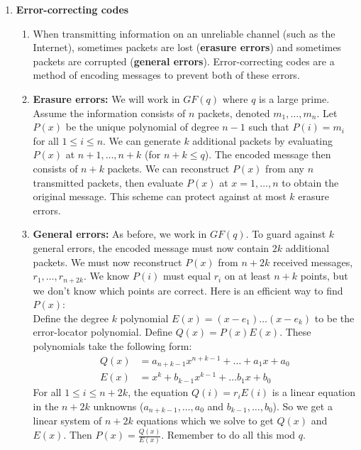 \documentclass[10pt]{article}
\begin{document}
\begin{multicols}{2}
\begin{enumerate}
    \item \textbf{Error-correcting codes}
    \begin{enumerate}
        \item When transmitting information on an unreliable channel (such as the Internet), sometimes packets are lost (\textbf{erasure errors}) and sometimes packets are corrupted (\textbf{general errors}). Error-correcting codes are a method of encoding messages to prevent both of these errors.
        \item \textbf{Erasure errors:} We will work in $GF(q)$ where $q$ is a large prime. Assume the information consists of $n$ packets, denoted $m_1,\hdots,m_n$. Let $P(x)$ be the unique polynomial of degree $n-1$ such that $P(i)=m_i$ for all $1 \leq i \leq n$. We can generate $k$ additional packets by evaluating $P(x)$ at $n+1,\hdots,n+k$ (for $n+k \leq q$). The encoded message then consists of $n+k$ packets. We can reconstruct $P(x)$ from any $n$ transmitted packets, then evaluate $P(x)$ at $x=1,\hdots,n$ to obtain the original message. This scheme can protect against at most $k$ erasure errors.
        \item \textbf{General errors:} As before, we work in $GF(q)$. To guard against $k$ general errors, the encoded message must now contain $2k$ additional packets. We must now reconstruct $P(x)$ from $n+2k$ received messages, $r_1,\hdots,r_{n+2k}$. We know $P(i)$ must equal $r_i$ on at least $n+k$ points, but we don't know which points are correct. Here is an efficient way to find $P(x)$: \\ Define the degree $k$ polynomial $E(x)=(x-e_1) \ldots (x-e_k)$ to be the error-locator polynomial. Define $Q(x)=P(x)E(x)$. These polynomials take the following form:
        \begin{align*}
            Q(x)&=a_{n+k-1}x^{n+k-1}+\hdots+a_1x+a_0 \\
            E(x)&=x^k+b_{k-1}x^{k-1}+\hdots b_1x+b_0
        \end{align*}
        For all $1 \leq i \leq n+2k$, the equation $Q(i)=r_iE(i)$ is a linear equation in the $n+2k$ unknowns ($a_{n+k-1},\hdots,a_0$ and $b_{k-1},\hdots,b_0$). So we get a linear system of $n+2k$ equations which we solve to get $Q(x)$ and $E(x)$. Then $P(x)=\frac{Q(x)}{E(x)}$. Remember to do all this mod $q$.
    \end{enumerate}
        

\end{enumerate}
\end{multicols}
\end{document}
